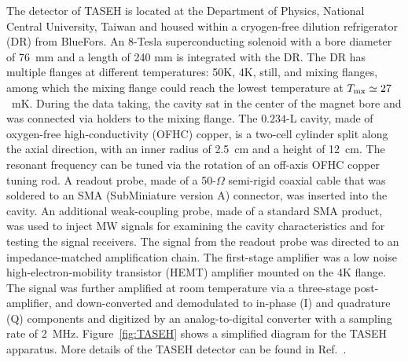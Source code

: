 \documentclass[%
 reprint,prl, %
superscriptaddress,
nobibnotes,
 amsmath,amssymb,
 aps,
]{revtex4-2}
\begin{document}
The detector of TASEH is located at the Department of Physics, National 
Central University, Taiwan and housed within a cryogen-free 
dilution refrigerator (DR) from BlueFors. An 8-Tesla 
superconducting solenoid with a 
bore diameter of 76~mm and a length of 240 mm is integrated with the DR.  
The DR has multiple flanges at different temperatures: 50K, 4K, still, 
and mixing flanges, among which the mixing flange could reach the lowest 
temperature at $T_{\rm mx}\simeq27$~mK. 
%
During the data taking, the cavity sat in the center of the magnet bore 
and was connected via holders to the mixing flange. %
The $0.234$-L cavity, 
made of oxygen-free high-conductivity (OFHC) copper, 
 is a two-cell cylinder split along 
the axial direction, with an inner radius of 2.5~cm and a 
height of 12~cm. %
The resonant frequency can be tuned via the rotation of an off-axis OFHC 
copper tuning rod. 
%
A readout probe, made of a 50-$\Omega$ semi-rigid coaxial cable that was 
soldered to an SMA (SubMiniature version A) connector, was inserted into the 
cavity.  
An additional weak-coupling probe, made of a standard SMA 
product, was used to inject MW signals for examining the cavity 
characteristics and for testing the signal receivers.  
The signal from the readout probe was directed to an 
impedance-matched amplification chain. The first-stage amplifier was 
a low noise high-electron-mobility transistor (HEMT) amplifier 
mounted on the 4K flange. %
The signal was further amplified at room temperature via a 
three-stage post-amplifier, and down-converted 
and demodulated to in-phase (I) and quadrature (Q) components and digitized 
by an analog-to-digital converter with a sampling rate of 2~MHz. 
Figure~\ref{fig:TASEH} shows a simplified diagram for the TASEH apparatus. 
More details of the TASEH detector can be found 
in Ref.~\cite{TASEHInstrumentation}. 
\end{document}
